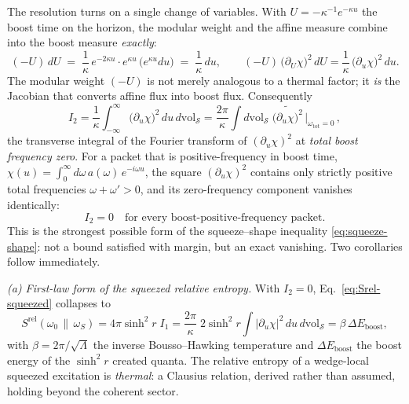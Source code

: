 \documentclass[11pt]{article}
\newcommand{\Srel}{S^{\mathrm{rel}}}
\begin{document}
The resolution turns on a single change of variables. With $U = -\kappa^{-1} e^{-\kappa u}$ the boost time on the horizon, the modular weight and the affine measure combine into the boost measure \emph{exactly}:
\begin{equation}
(-U)\, dU \;=\; \frac{1}{\kappa}\, e^{-2\kappa u} \cdot e^{\kappa u}\,\big(e^{\kappa u} du\big)
\;=\; \frac{1}{\kappa}\, du,
\qquad
(-U)\,\big(\partial_U \chi\big)^2\, dU = \frac{1}{\kappa}\,\big(\partial_u \chi\big)^2\, du .
\label{eq:jacobian-identity}
\end{equation}
The modular weight $(-U)$ is not merely analogous to a thermal factor; it \emph{is} the Jacobian that converts affine flux into boost flux. Consequently
\begin{equation}
I_2 = \frac{1}{\kappa} \int_{-\infty}^{\infty} \big(\partial_u \chi\big)^2 \, du \, d\mathrm{vol}_{\mathcal{S}}
= \frac{2\pi}{\kappa} \int d\mathrm{vol}_{\mathcal{S}} \;
\widetilde{\big(\partial_u\chi\big)^2}\,\Big|_{\omega_{\mathrm{tot}} = 0}\,,
\label{eq:I2-fourier}
\end{equation}
the transverse integral of the Fourier transform of $(\partial_u\chi)^2$ at \emph{total boost frequency zero}. For a packet that is positive-frequency in boost time, $\chi(u) = \int_0^\infty d\omega\, a(\omega)\, e^{-i\omega u}$, the square $(\partial_u\chi)^2$ contains only strictly positive total frequencies $\omega + \omega' > 0$, and its zero-frequency component vanishes identically:
\begin{equation}
\boxed{\; I_2 = 0 \quad \text{for every boost-positive-frequency packet.} \;}
\label{eq:I2-zero}
\end{equation}
This is the strongest possible form of the squeeze--shape inequality \eqref{eq:squeeze-shape}: not a bound satisfied with margin, but an exact vanishing. Two corollaries follow immediately.

\emph{(a) First-law form of the squeezed relative entropy.} With $I_2 = 0$, Eq.~\eqref{eq:Srel-squeezed} collapses to
\begin{equation}
\Srel(\omega_0\,\|\,\omega_S)
= 4\pi \sinh^2\! r \; I_1
= \frac{2\pi}{\kappa}\; 2\sinh^2\! r \int \big|\partial_u \chi\big|^2\, du\, d\mathrm{vol}_{\mathcal{S}}
= \beta\, \Delta E_{\mathrm{boost}} ,
\label{eq:first-law}
\end{equation}
with $\beta = 2\pi/\sqrt{\Lambda}$ the inverse Bousso--Hawking temperature and $\Delta E_{\mathrm{boost}}$ the boost energy of the $\sinh^2\! r$ created quanta. The relative entropy of a wedge-local squeezed excitation is \emph{thermal}: a Clausius relation, derived rather than assumed, holding beyond the coherent sector.
\end{document}

